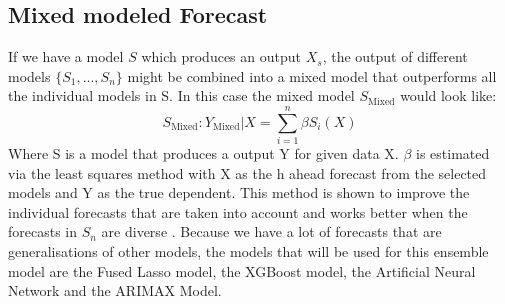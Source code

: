 




\subsection{Mixed modeled Forecast}
\label{subseq:mixed model}
If we have a model $S$ which produces an output $X_s$, the output of different models $\{S_1, ..., S_n\}$ might be combined into a mixed model that outperforms all the individual models in S. In this case the mixed model $S_{\text{Mixed}}$ would look like:
\begin{equation}
    S_{\text{Mixed}}: Y_{\text{Mixed}} | X = \sum\limits_{i=1}^n \beta S_i(X)
\end{equation}
Where S is a model that produces a output Y for given data X. $\beta$ is estimated via the least squares method with X as the h ahead forecast from the selected models and Y as the true dependent. This method is shown to improve the individual forecasts that are taken into account and works better when the forecasts in $S_n$ are diverse \citep{Yang2004CombiningResults}. Because we have a lot of forecasts that are generalisations of other models, the models that will be used for this ensemble model are the Fused Lasso model, the XGBoost model, the Artificial Neural Network and the ARIMAX Model.
 
